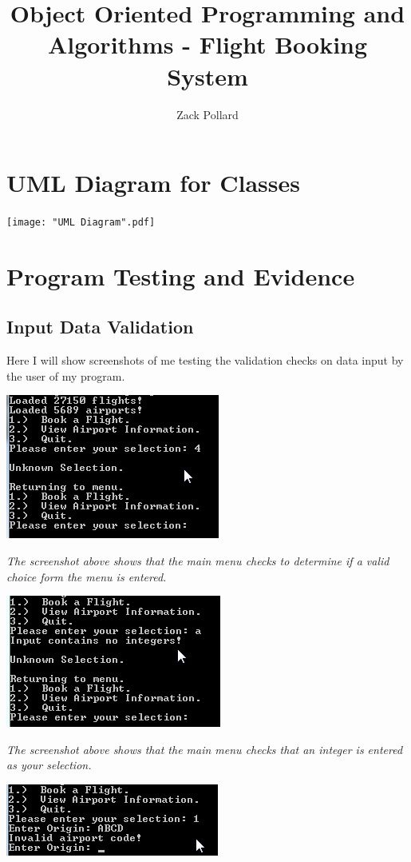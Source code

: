 \documentclass[10pt, a4paper]{article}
\begin{document}

\title{Object Oriented Programming and Algorithms - Flight Booking System}
\author{Zack Pollard}
\maketitle
\section{UML Diagram for Classes}
\texttt{[image: "UML Diagram".pdf]}
\newpage
\section{Program Testing and Evidence}
\subsection{Input Data Validation}
Here I will show screenshots of me testing the validation checks on data input by the user of my program.

\includegraphics{Validation1.png}

\textit{The screenshot above shows that the main menu checks to determine if a valid choice form the menu is entered.}

\includegraphics{Validation2.png}

\textit{The screenshot above shows that the main menu checks that an integer is entered as your selection.}

\includegraphics{Validation3.png}
\end{document}

